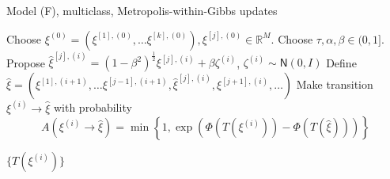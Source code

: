 \documentclass{siamart1116}
\begin{document}
        \begin{algorithm}
            \caption{Model (F), multiclass, Metropolis-within-Gibbs updates}
            \label{alg:multiclass_nonhier}
            \begin{algorithmic}[1]
            \State Choose $\xi^{(0)} = (\xi^{[1],(0)}, \ldots \xi^{[k],(0)}), \xi^{[j],(0)} \in \mathbb{R}^M$. Choose $\tau, \alpha, \beta \in (0, 1]$. 
                    \State Propose $\hat\xi^{[j],(i)} = (1-\beta^2)^{\frac{1}{2}}\xi^{[j],(i)} + \beta \zeta^{(i)}$, $\zeta^{(i)} \sim \mathsf{N}(0, I)$
                    \State Define $\hat \xi = (\xi^{[1],(i+1)}, \ldots \xi^{[j-1],(i+1)}, \hat\xi^{[j],(i)}, \xi^{[j+1],(i)}, \ldots)$
                    \State Make transition $\xi^{(i)} \to \hat\xi$ with probability
                    \[ A(\xi^{(i)} \to \hat\xi) = \min\left\{1, \exp\left(\Phi(T(\xi^{(i)})) - \Phi(T(\hat \xi))\right) \right\}\]

                \EndFor
            \EndFor
            \State \Return $\{T(\xi^{(i)})\}$
            \end{algorithmic}
        \end{algorithm}


\end{document}

